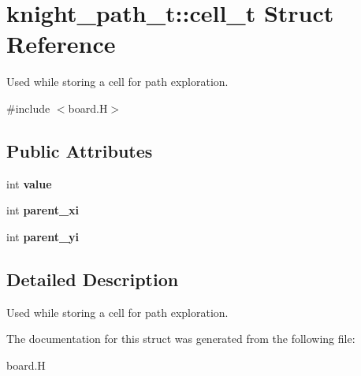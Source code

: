\hypertarget{structknight__path__t_1_1cell__t}{\section{knight\-\_\-path\-\_\-t\-:\-:cell\-\_\-t \-Struct \-Reference}
\label{structknight__path__t_1_1cell__t}
}


\-Used while storing a cell for path exploration.  




{\ttfamily \#include $<$board.\-H$>$}

\subsection*{\-Public \-Attributes}
\begin{DoxyCompactItemize}
\item 
\hypertarget{structknight__path__t_1_1cell__t_a4567f1ea0acc371fbc29a24d4ae88542}{int {\bfseries value}}\label{structknight__path__t_1_1cell__t_a4567f1ea0acc371fbc29a24d4ae88542}

\item 
\hypertarget{structknight__path__t_1_1cell__t_ae378eb89a650b86bc4ac579ca768ed0f}{int {\bfseries parent\-\_\-xi}}\label{structknight__path__t_1_1cell__t_ae378eb89a650b86bc4ac579ca768ed0f}

\item 
\hypertarget{structknight__path__t_1_1cell__t_a9c0749b9e00a4bd34ab42932fd40bfc7}{int {\bfseries parent\-\_\-yi}}\label{structknight__path__t_1_1cell__t_a9c0749b9e00a4bd34ab42932fd40bfc7}

\end{DoxyCompactItemize}


\subsection{\-Detailed \-Description}
\-Used while storing a cell for path exploration. 

\-The documentation for this struct was generated from the following file\-:\begin{DoxyCompactItemize}
\item 
board.\-H\end{DoxyCompactItemize}
